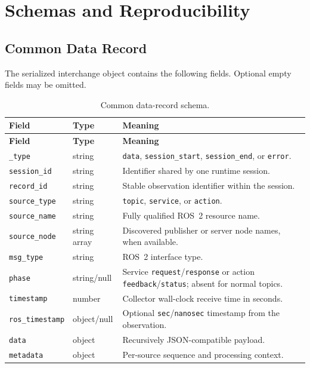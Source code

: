 \chapter{Schemas and Reproducibility}

\section{Common Data Record}\label{app:data-record}

The serialized interchange object contains the following fields. Optional empty
fields may be omitted.

\begin{longtable}{p{}p{}p{}}
\caption{Common data-record schema.}\\
\toprule
\textbf{Field} & \textbf{Type} & \textbf{Meaning}\\
\midrule
\endfirsthead
\toprule
\textbf{Field} & \textbf{Type} & \textbf{Meaning}\\
\midrule
\endhead
\texttt{\_type} & string & \texttt{data}, \texttt{session\_start},
\texttt{session\_end}, or \texttt{error}.\\
\texttt{session\_id} & string & Identifier shared by one runtime session.\\
\texttt{record\_id} & string & Stable observation identifier within the
session.\\
\texttt{source\_type} & string & \texttt{topic}, \texttt{service}, or
\texttt{action}.\\
\texttt{source\_name} & string & Fully qualified ROS~2 resource name.\\
\texttt{source\_node} & string array & Discovered publisher or server node
names, when available.\\
\texttt{msg\_type} & string & ROS~2 interface type.\\
\texttt{phase} & string/null & Service \texttt{request}/\texttt{response} or
action \texttt{feedback}/\texttt{status}; absent for normal topics.\\
\texttt{timestamp} & number & Collector wall-clock receive time in seconds.\\
\texttt{ros\_timestamp} & object/null & Optional \texttt{sec}/\texttt{nanosec}
timestamp from the observation.\\
\texttt{data} & object & Recursively JSON-compatible payload.\\
\texttt{metadata} & object & Per-source sequence and processing context.\\
\bottomrule
\end{longtable}

